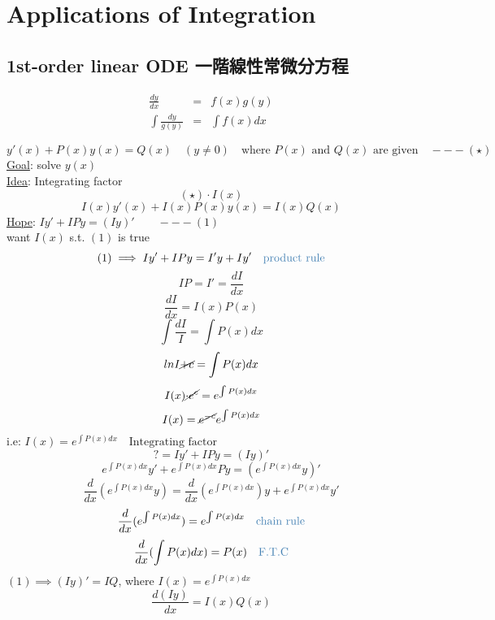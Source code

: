 %
%

\graphicspath{{./figures/applications/}}

\chapter{Applications of Integration} \label{chap int app}
\section{1st-order linear ODE 一階線性常微分方程}
\begin{defn}
\[\begin{array}{rcl}
\displaystyle \frac{dy}{dx} & = & f(x) g(y)\\
\displaystyle \int \frac{dy}{g(y)} & = & \displaystyle \int f(x)dx
\end{array}\]
\end{defn}
\[y'(x) + P(x)y(x) = Q(x) \quad (y \neq 0) \quad \text{where } P(x) \text{ and } Q(x) \text{ are given} \quad ---(\star)\]
\underline{Goal}: solve \(y(x) \)\\
\underline{Idea}: Integrating factor\\
\[(\star) \cdot I(x)\]
\[I(x)y'(x) + I(x)P(x)y(x) = I(x)Q(x)\]
\underline{Hope}: \(Iy' + IPy = (Iy)' \quad \quad ---(1)\)\\
want \( I(x) \) s.t. \((1)\) is true\\
\[(1) \implies Iy' + IPy = I'y + Iy' \quad \text{\tssteelblue{product rule}}\]
\[IP = I' = \displaystyle \frac{dI}{dx}\]
\[\displaystyle \frac{dI}{dx} = I(x)P(x)\]
\[\displaystyle \int \frac{dI}{I} = \int P(x) dx\]
\[\displaystyle ln I \cancel{+ c} = \int P(x) dx\]
\[I(x) \cancel{\cdot e^c} = e^{\int P(x)dx}\]
\[I(x) = \cancel{e^{-c}} e^{\int P(x)dx}\]
i.e: \(I(x) = e^{\int P(x)dx} \quad \text{Integrating factor}\)
\[?= Iy' + IPy = (Iy)'\]
\[e^{\int P(x) dx} y' + e^{\int P(x)dx} Py = (e^{\int P(x)dx} y)'\]
\[\displaystyle \frac{d}{dx}(e^{\int P(x)dx} y) = \frac{d}{dx}(e^{\int P(x)dx})y + e^{\int P(x)dx} y'\]
\[\displaystyle \frac{d}{dx}(e^{\int P(x)dx}) = e^{\int P(x)dx} \quad \text{\tssteelblue{chain rule}}\]
\[\displaystyle \frac{d}{dx} (\int P(x)dx) = P(x) \quad \text{\tssteelblue{F.T.C}}\]
\((1) \implies (Iy)' = IQ\), where \(I(x) = e^{\int P(x)dx}\)
\[\displaystyle \frac{d(Iy)}{dx} = I(x)Q(x)\]
